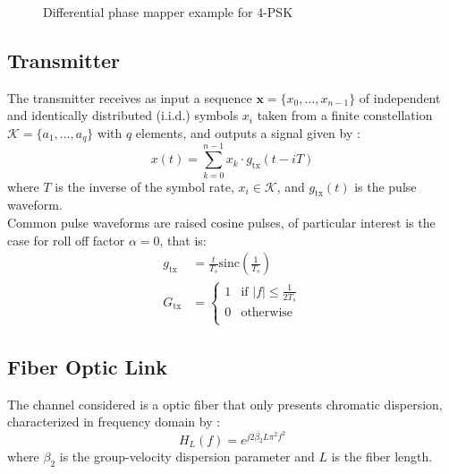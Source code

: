 \begin{figure}[htbp]
\begin{center}
\caption{Differential phase mapper example for 4-PSK}
\label{fig:diff_encoding}
\end{center}
\end{figure}



\subsection{Transmitter}

The transmitter receives as input a sequence $\bm x=\{x_0,\dotsc,x_{n-1}\}$ of independent and identically distributed (i.i.d.) symbols $x_i$ taken from a finite constellation $\mathcal K=\{a_1,\dotsc,a_q\}$ with $q$ elements, and outputs a signal given by \cite{Plabst_DD}:
\begin{equation}
x(t)=\sum_{k=0}^{n-1}x_k\cdot g_\text{tx}(t-iT)
\label{eq:Plabst_signaling_block}
\end{equation}
where $T$ is the inverse of the symbol rate, $x_i\in\mathcal K$, and $g_\text{tx}(t)$ is the pulse waveform.\\


Common pulse waveforms are raised cosine pulses, of particular interest is the case for roll off factor $\alpha=0$, that is:
\begin{align}
	g_\text{tx}&=\frac{t}{T_s}\text{sinc}\left(\frac{1}{T_s}\right)
	\label{eq:sinc_pulse_TD}\\
	G_\text{tx}&=\left\{
\begin{array}{ll}
1  &  \text{if }|f|\leq\frac{1}{2T_s}   \\
0  &  \text{otherwise} \\
\end{array}
\right.
\label{eq:sinc_pulse_FD}
\end{align}

\subsection{Fiber Optic Link}

The channel considered is a optic fiber that only presents chromatic dispersion, characterized in frequency domain by \cite{Plabst_DD}:
\begin{equation}
H_L(f)=e^{j2\beta_2L\pi^2f^2}
\end{equation}
where $\beta_2$ is the group-velocity dispersion parameter and $L$ is the fiber length.


